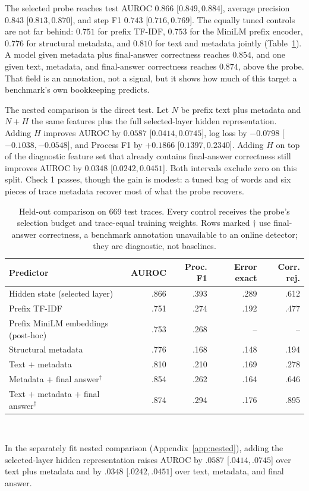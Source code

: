 \documentclass{article}
\begin{document}
The selected probe reaches test AUROC $0.866$ [$0.849,0.884$], average precision $0.843$
[$0.813,0.870$], and step F1 $0.743$ [$0.716,0.769$]. The equally tuned controls are not far behind:
$0.751$ for prefix TF-IDF, $0.753$ for the MiniLM prefix encoder, $0.776$ for structural metadata,
and $0.810$ for text and metadata jointly (Table~\ref{tab:main}). A model given metadata plus
final-answer correctness reaches $0.854$, and one given text, metadata, and final-answer
correctness reaches $0.874$, above the probe. That field is an annotation, not a signal, but it
shows how much of this target a benchmark's own bookkeeping predicts.

The nested comparison is the direct test. Let $N$ be prefix text plus metadata and $N+H$ the same
features plus the full selected-layer hidden representation. Adding $H$ improves AUROC by $0.0587$
[$0.0414,0.0745$], log loss by $-0.0798$ [$-0.1038,-0.0548$], and Process F1 by $+0.1866$
[$0.1397,0.2340$]. Adding $H$ on top of the diagnostic feature set that already contains
final-answer correctness still improves AUROC by $0.0348$ [$0.0242,0.0451$]. Both intervals exclude
zero on this split. Check 1 passes, though the gain is modest: a tuned bag of words
and six pieces of trace metadata recover most of what the probe recovers.

\begin{table}[t]
\centering
\small
\caption{Held-out comparison on 669 test traces. Every control receives the probe's selection
budget and trace-equal training weights. Rows marked $\dagger$ use final-answer correctness, a
benchmark annotation unavailable to an online detector; they are diagnostic, not baselines.}
\label{tab:main}
\setlength{\tabcolsep}{5pt}
\begin{tabular}{lrrrr}
\toprule
Predictor & AUROC & Proc. F1 & Error exact & Corr. rej. \\
\midrule
Hidden state (selected layer) & .866 & .393 & .289 & .612 \\
Prefix TF-IDF & .751 & .274 & .192 & .477 \\
Prefix MiniLM embeddings (post-hoc) & .753 & .268 & -- & -- \\
Structural metadata & .776 & .168 & .148 & .194 \\
Text $+$ metadata & .810 & .210 & .169 & .278 \\
Metadata $+$ final answer$^\dagger$ & .854 & .262 & .164 & .646 \\
Text $+$ metadata $+$ final answer$^\dagger$ & .874 & .294 & .176 & .895 \\
\bottomrule
\end{tabular}
\\[0.6mm]
\raggedright\footnotesize In the separately fit nested comparison (Appendix~\ref{app:nested}),
adding the selected-layer hidden representation raises AUROC by $.0587$ [$.0414,.0745$] over text
plus metadata and by $.0348$ [$.0242,.0451$] over text, metadata, and final answer.
\end{table}
\end{document}

